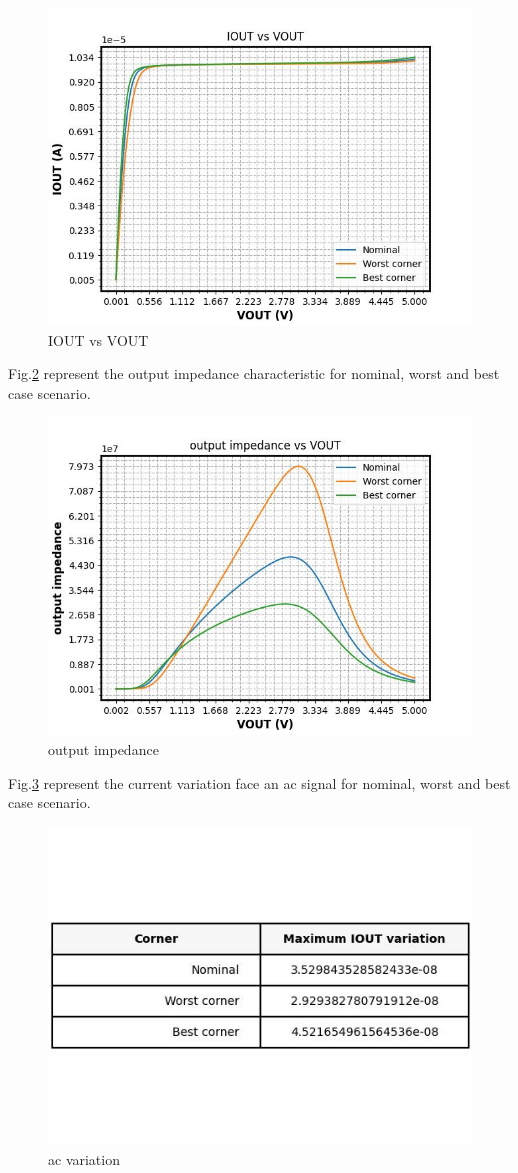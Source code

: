 \documentclass{article}
\begin{document}
\begin{figure}[H] %
    \centering
    \includegraphics[width=.6\textwidth]{./IOUT_vs_VOUT.jpg} %
    \caption{IOUT vs VOUT}\label{fig:iout_vs_vout}
\end{figure}




Fig.\ref{fig:output_impedance} represent the output impedance characteristic for nominal, worst and best case scenario.

\begin{figure}[H] %
    \centering
    \includegraphics[width=.6\textwidth]{./output_impedance_vs_VOUT.jpg} %
    \caption{output impedance}\label{fig:output_impedance}
\end{figure}



Fig.\ref{fig:ac_current_variation} represent the current variation face an ac signal for nominal, worst and best case scenario.

\begin{figure}[H] %
    \centering
    \includegraphics[width=.6\textwidth]{./ac_bias_table.jpg} %
    \caption{ac variation}\label{fig:ac_current_variation}
\end{figure}
\end{document}

